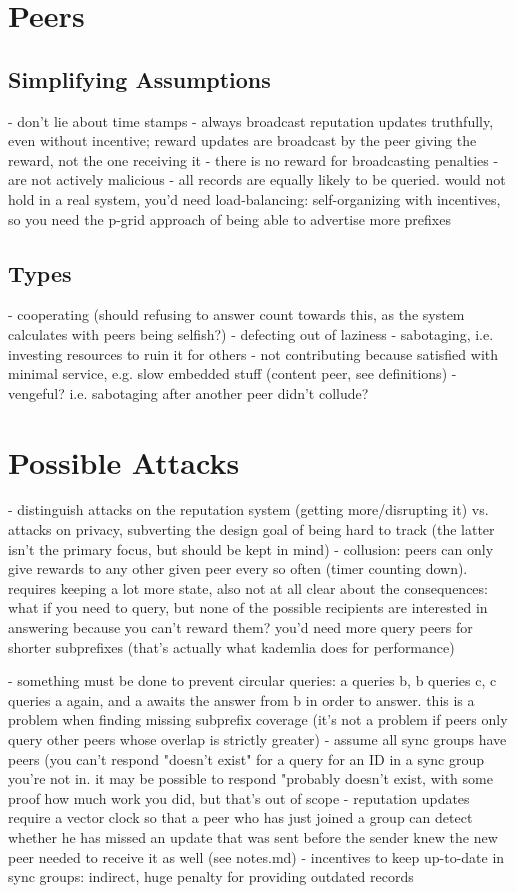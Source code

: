 \section{Peers}
\subsection{Simplifying Assumptions}
- don't lie about time stamps
- always broadcast reputation updates truthfully, even without incentive; reward
  updates are broadcast by the peer giving the reward, not the one receiving it
- there is no reward for broadcasting penalties
- are not actively malicious
- all records are equally likely to be queried. would not hold in a real system,
  you'd need load-balancing: self-organizing with incentives, so you need the
  p-grid approach of being able to advertise more prefixes
\subsection{Types}
- cooperating (should refusing to answer count towards this, as the system
  calculates with peers being selfish?)
- defecting out of laziness
- sabotaging, i.e. investing resources to ruin it for others
- not contributing because satisfied with minimal service, e.g. slow embedded
  stuff (content peer, see definitions)
- vengeful? i.e. sabotaging after another peer didn't collude?

\section{Possible Attacks}
- distinguish attacks on the reputation system (getting more/disrupting it) vs.
  attacks on privacy, subverting the design goal of being hard to track (the
  latter isn't the primary focus, but should be kept in mind)
- collusion: peers can only give rewards to any other given peer every so often
  (timer counting down). requires keeping a lot more state, also not at all
  clear about the consequences: what if you need to query, but none of the
  possible recipients are interested in answering because you can't reward them?
  you'd need more query peers for shorter subprefixes (that's actually what
  kademlia does for performance)


- something must be done to prevent circular queries: a queries b, b queries c,
  c queries a again, and a awaits the answer from b in order to answer. this is
  a problem when finding missing subprefix coverage (it's not a problem if peers
  only query other peers whose overlap is strictly greater)
- assume all sync groups have peers (you can't respond "doesn't exist" for a
  query for an ID in a sync group you're not in. it may be possible to respond
  "probably doesn't exist, with some proof how much work you did, but that's out
  of scope
- reputation updates require a vector clock so that a peer who has just joined a
  group can detect whether he has missed an update that was sent before the
  sender knew the new peer needed to receive it as well (see notes.md)
- incentives to keep up-to-date in sync groups: indirect, huge penalty for
  providing outdated records
